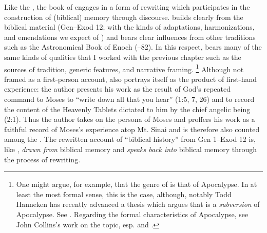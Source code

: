 Like the \ga, the book of \jub engages in a form of rewriting which participates in the construction of (biblical) memory through \psgraphical discourse. \jub builds clearly from the biblical material (Gen--Exod 12; with the kinds of adaptations, harmonizations, and emendations we expect of \rwb) and bears clear influences from other \secondtemple traditions such as the Astronomical Book of Enoch (--82). In this respect, \jub bears many of the same kinds of qualities that I worked with the previous chapter such as the sources of tradition, generic features, and narrative framing.%
    \footnote{One might argue, for example, that the genre of \jub is that  of Apocalypse. In at least the most formal sense, this is the case, although, notably Todd Hanneken has recently advanced a thesis which argues that \jub is a \emph{subversion} of Apocalypse. See \cite{hanneken2012}. Regarding the formal characteristics of Apocalypse, see John Collins's work on the topic, esp. \cite{collins_mason-etal2012} and \cite{collins_semeia1979}.}
Although not framed as a first-person account, \jub also portrays itself as the product of first-hand experience: the author presents his work as the result of God's repeated command to Moses to ``write down all that you hear'' (1:5, 7, 26) and to record the content of the Heavenly Tablets dictated to him by the chief angelic being (2:1). Thus the author takes on the persona of Moses and proffers his work as a faithful record of Moses's experience atop Mt. Sinai and is therefore also counted among the \psa. The rewritten account of ``biblical history'' from Gen 1--Exod 12 is, like \ga, \emph{drawn from} biblical memory and \emph{speaks back into} biblical memory through the process of rewriting. 

